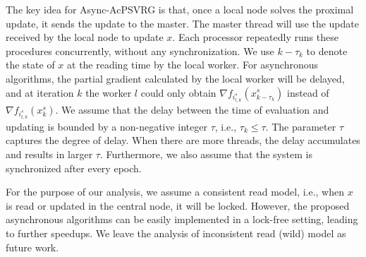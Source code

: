 \documentclass[conference]{IEEEtran}
\newcommand{\Initialize}{\textbf{Initialize:}{\,}}
\newcommand{\Input}{\textbf{Input:}{\,}}
\newcommand{\Output}{\textbf{Output:}{\,}}
\theoremstyle{definition}
\theoremstyle{remark}
\begin{document}
The key idea for Async-AcPSVRG is that, once a local node solves the proximal update, it  sends  the update to the master. The master thread will use the update received by the local node to update $x$. Each processor repeatedly runs these procedures concurrently, without any synchronization. We use $k-\tau_k$ to denote the state of $x$ at the reading time by the local worker. For asynchronous algorithms, the partial gradient calculated by the local worker will be delayed, and at iteration $k$ the worker $l$ could only obtain $\nabla f_{i_{l,k}^s}(x_{k-\tau_k}^s)$ instead of $\nabla f_{i_{l,k}^s}(x_{k}^s)$. We assume that the delay between the time of evaluation and updating is bounded by a non-negative integer $\tau$, i.e., $\tau_k\leq \tau$. The parameter $\tau$ captures the degree of delay. When there are more threads, the delay accumulates and results in larger $\tau$. Furthermore, we also assume that the system is synchronized after every epoch.

For the purpose of our analysis, we assume a consistent read model, i.e., when $x$ is read or updated in the central node, it will be locked. However, the proposed asynchronous algorithms can be easily implemented in a lock-free setting, leading to further speedups. We leave the analysis of inconsistent read (wild) model as future work.


\end{document}
